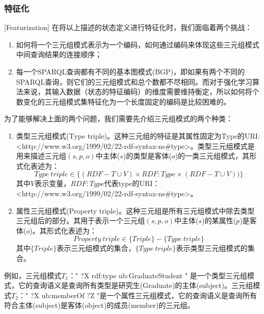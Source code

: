 \subsubsection{特征化}[Featurization]
在将以上描述的状态定义进行特征化时，我们面临着两个挑战：
\begin{enumerate}
    \item 如何将一个三元组模式表示为一个编码，如何通过编码来体现这些三元组模式中间查询结果的连接顺序；
    \item 每一个SPARQL查询都有不同的基本图模式(BGP)，即如果有两个不同的SPARQL查询，则它们的三元组模式和总个数都不尽相同。而对于强化学习算法来说，其输入数据（状态的特征编码）的维度需要维持衡定，所以如何将个数变化的三元组模式集特征化为一个长度固定的编码是比较困难的。
\end{enumerate}

为了能够解决上面的两个问题，我们需要先介绍三元组模式的两个种类：
\begin{enumerate}
    \item 类型三元组模式(Type triple)。这种三元组的特征是其属性固定为Type的URI: <http://www.w3.org/1999/02/22-rdf-syntax-ns\#type>。类型三元组模式是用来描述三元组$(s,p,o)$中主体($s$)的类型是客体($o$)的一类三元组模式，其形式化表述为：$$Type\ triple \in \lbrace (RDF-T \cup V)\times RDF:Type\times (RDF-T \cup V) ) \rbrace$$ 其中$V$表示变量，$RDF:Type$代表type的URI：<http://www.w3.org/1999/02/22-rdf-syntax-ns\#type>。
    \item 属性三元组模式(Property triple)。这种三元组是所有三元组模式中除去类型三元组后的部分。其用于表示一个三元组$(s,p,o)$中主体($s$)的某属性($p$)是客体($o$)。其形式化表述为：$$Property\ triple \in \lbrace Triple \rbrace - \lbrace Type\ triple \rbrace $$ 其中$\lbrace Triple \rbrace$表示三元组模式的集合，$\lbrace Type\ triple \rbrace$表示类型三元组模式的集合。
\end{enumerate}

例如，三元组模式$T_1$：" ?X rdf:type ub:GraduateStudent " 是一个类型三元组模式，它的查询语义是查询所有类型是研究生(Graduate)的主体(subject)。三元组模式$T_2$：" ?X ub:memberOf ?Z "是一个属性三元组模式，它的查询语义是查询所有符合主体(subject)是客体(object)的成员(member)的三元组。

